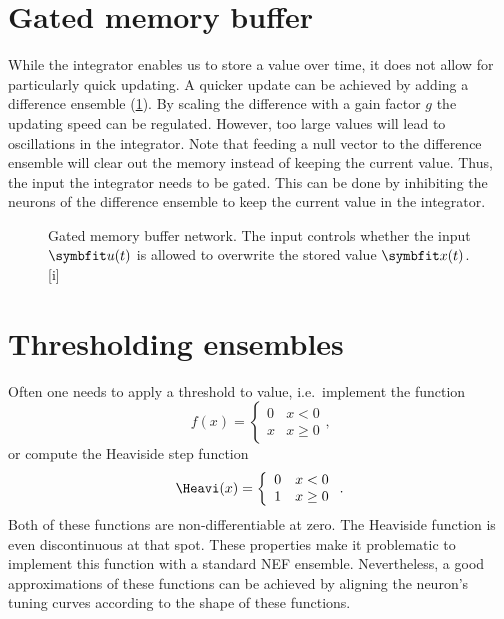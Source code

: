 \section{Gated memory buffer}
While the integrator enables us to store a value over time, it does not allow for particularly quick updating.
A quicker update can be achieved by adding a difference ensemble (\cref{fig:gated-mem}).
By scaling the difference with a gain factor $g$ the updating speed can be regulated.
However, too large values will lead to oscillations in the integrator.
Note that feeding a null vector to the difference ensemble will clear out the memory instead of keeping the current value.
Thus, the input the integrator needs to be gated.
This can be done by inhibiting the neurons of the difference ensemble to keep the current value in the integrator.
\begin{figure}
    \begin{captionbeside}{Gated memory buffer network. The  input controls whether the input $\vc u(t)$ is allowed to overwrite the stored value $\vc x(t)$.}[i]
\end{captionbeside}\label{fig:gated-mem}
\end{figure}

\section{Thresholding ensembles}\label{sec:thresholding}
Often one needs to apply a threshold to value, i.e.\ implement the function
\begin{equation}
    f(x) = \left\{ \begin{array}{ll}
            0 & x < 0 \\
            x & x \geq 0
        \end{array} \right.
    \text{,}
\end{equation}
or compute the Heaviside step function
\begin{equation}
    \Heavi(x) = \left\{ \begin{array}{ll}
            0 & x < 0 \\
            1 & x \geq 0
        \end{array} \right.
    \text{.}
\end{equation}
Both of these functions are non-differentiable at zero.
The Heaviside function is even discontinuous at that spot.
These properties make it problematic to implement this function with a standard NEF ensemble.
Nevertheless, a good approximations of these functions can be achieved by aligning the neuron's tuning curves according to the shape of these functions.

